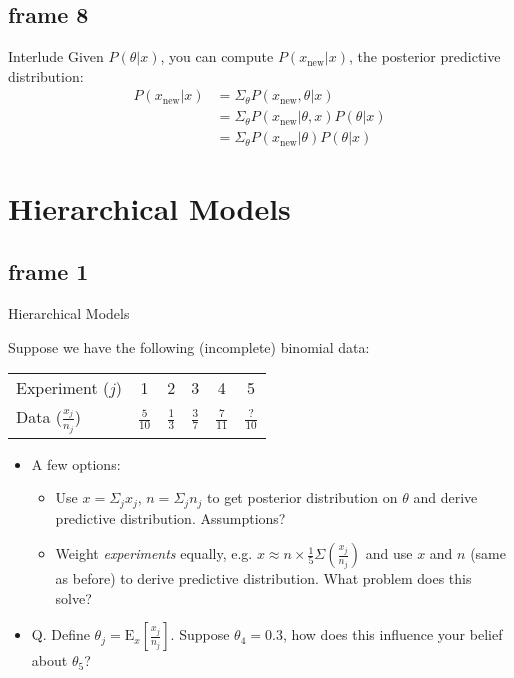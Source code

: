 \documentclass[xcolor=x11names,compress]{beamer}
\renewcommand{\(}{\begin{columns}}
\renewcommand{\)}{\end{columns}}
\newcommand{\<}[1]{\begin{column}{#1}}
\renewcommand{\>}{\end{column}}
\begin{document}
\subsection{frame 8}
\begin{frame}{Interlude}
Given $P(\theta | x)$, you can compute $P(x_\text{new} | x)$, the posterior predictive distribution:
\pause 
\begin{align*}
P(x_\text{new} | x)&=\Sigma_\theta P(x_\text{new}, \theta | x) \\
&=\Sigma_\theta P(x_\text{new} | \theta, x)P(\theta | x) \\
&=\Sigma_\theta P(x_\text{new} | \theta)P(\theta | x)
\end{align*}

\end{frame}

\section{Hierarchical Models}
\subsection{frame 1}
\begin{frame}{Hierarchical Models}
\begin{center}
Suppose we have the following (incomplete) binomial data: \\
\begin{tabular}{l|c|c|c|c|c} \hline
Experiment ($j$) & 1 & 2 & 3 & 4 & 5 \\
Data ($\frac{x_j}{n_j}$) & $\frac{5}{10}$ & $\frac{1}{3}$ & $\frac{3}{7}$ & $\frac{7}{11}$ & $\frac{?}{10}$ \\ \hline
\end{tabular}
\end{center}

\begin{itemize}
\pause \item A few options:
	\begin{itemize}
	\pause \item Use $x = \Sigma_j x_j$, $n=\Sigma_j n_j$ to get posterior distribution on $\theta$ and derive predictive distribution. Assumptions?
	\pause \item Weight \textit{experiments} equally, e.g. $x \approx n \times \frac{1}{5}\Sigma(\frac{x_j}{n_j})$ and use $x$ and $n$ (same as before) to derive predictive distribution. What problem does this solve?
	\end{itemize}
\pause \item Q. Define $\theta_j = \text{E}_x[\frac{x_j}{n_j}]$. Suppose $\theta_4=0.3$, how does this influence your belief about $\theta_5$?
\end{itemize}

\end{frame}
\end{document}
